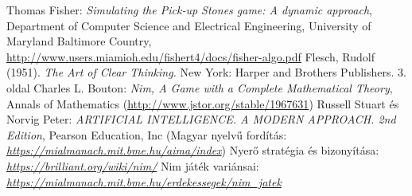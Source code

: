 \begin{thebibliography}{x}
 Thomas Fisher: {\em Simulating the Pick-up Stones game: A dynamic approach}, Department of Computer Science and Electrical Engineering,
University of Maryland Baltimore Country, {\ttfamily \url{ http://www.users.miamioh.edu/fishert4/docs/fisher-algo.pdf}}
Flesch, Rudolf (1951). {\em The Art of Clear Thinking.} New York: Harper and Brothers Publishers. 3. oldal
 Charles L. Bouton: {\em Nim, A Game with a Complete Mathematical Theory}, Annals of Mathematics (\url{http://www.jstor.org/stable/1967631})
Russell Stuart és Norvig Peter: {\em ARTIFICIAL INTELLIGENCE. A MODERN APPROACH. 2nd Edition},  Pearson Education, Inc (Magyar nyelvű fordítás: {\em \url{https://mialmanach.mit.bme.hu/aima/index}})
Nyerő stratégia és bizonyítása: {\em \url{ https://brilliant.org/wiki/nim/}}
Nim játék variánsai: {\em \url{https://mialmanach.mit.bme.hu/erdekessegek/nim_jatek}}
\end{thebibliography}
